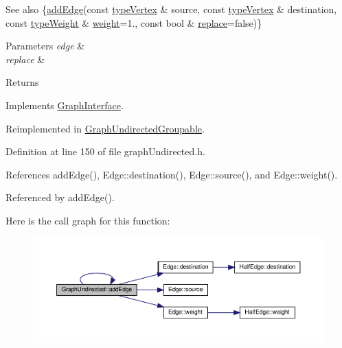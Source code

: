 \begin{DoxySeeAlso}{See also}
\{\hyperlink{classGraphUndirected_a2be69d987f3b4fa1cf547898d30b47d2}{add\+Edge}(const \hyperlink{edge_8h_a5fbd20c46956d479cb10afc9855223f6}{type\+Vertex} \& source, const \hyperlink{edge_8h_a5fbd20c46956d479cb10afc9855223f6}{type\+Vertex} \& destination, const \hyperlink{edge_8h_a2e7ea3be891ac8b52f749ec73fee6dd2}{type\+Weight} \& \hyperlink{classGraphUndirected_ae40d431c92d8b4884c7915c44d42f356}{weight}=1., const bool \& \hyperlink{classGraphUndirected_aee3bc279ffe39f8efb7dd60865279474}{replace}=false)\} 
\end{DoxySeeAlso}

\begin{DoxyParams}{Parameters}
{\em edge} & \\
\hline
{\em replace} & \\
\hline
\end{DoxyParams}
\begin{DoxyReturn}{Returns}

\end{DoxyReturn}


Implements \hyperlink{classGraphInterface_ae77357ec21f272f1e3fb4c93c5f99675}{Graph\+Interface}.



Reimplemented in \hyperlink{classGraphUndirectedGroupable_a2efe963916349ac6615721ab85a93ceb}{Graph\+Undirected\+Groupable}.



Definition at line 150 of file graph\+Undirected.\+h.



References add\+Edge(), Edge\+::destination(), Edge\+::source(), and Edge\+::weight().



Referenced by add\+Edge().

Here is the call graph for this function\+:
\nopagebreak
\begin{figure}[H]
\begin{center}
\leavevmode
\includegraphics[width=350pt]{classGraphUndirected_a366c8b7dbf1cbfe408d5399ad64494dc_cgraph}
\end{center}
\end{figure}
\mbox{\label{classGraphUndirected_acc533831ee3234a03a1cc0037b017a83}} 
